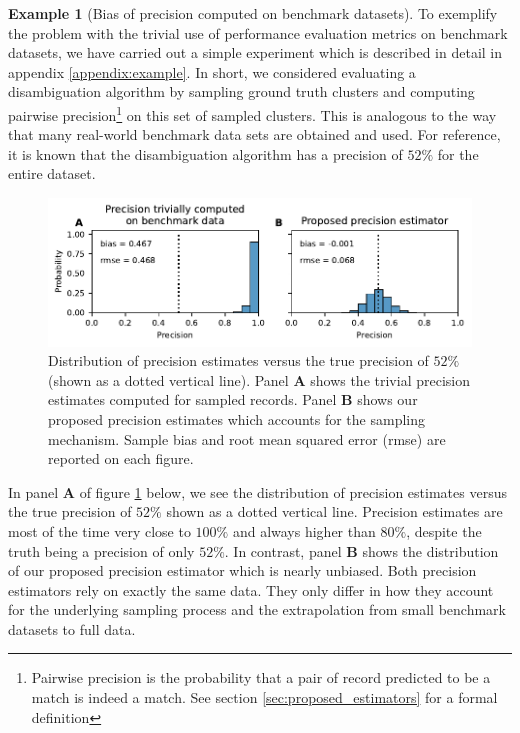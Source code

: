 \documentclass[fontsize=11pt]{article}
\theoremstyle{definition}
\newtheorem{example}{Example}
\begin{document}
\begin{example}[Bias of precision computed on benchmark datasets]\label{first_example}
    To exemplify the problem with the trivial use of performance evaluation metrics on benchmark datasets, we have carried out a simple experiment which is described in detail in appendix \ref{appendix:example}. In short, we considered evaluating a disambiguation algorithm by sampling ground truth clusters and computing pairwise precision\footnote{Pairwise precision is the probability that a pair of record predicted to be a match is indeed a match. See section \ref{sec:proposed_estimators} for a formal definition} on this set of sampled clusters. This is analogous to the way that many real-world benchmark data sets are obtained and used. For reference, it is known that the disambiguation algorithm has a precision of $52\%$ for the entire dataset.
    
    \begin{figure}[h]
        \centering
        \includegraphics[width=5.5in]{first-example}
        \caption{Distribution of precision estimates versus the true precision of $52\%$ (shown as a dotted vertical line). Panel \textbf{A} shows the trivial precision estimates computed for sampled records. Panel \textbf{B} shows our proposed precision estimates which accounts for the sampling mechanism. Sample bias and root mean squared error (rmse) are reported on each figure.}
        \label{fig:precision_problem}
    \end{figure}
    
    In panel \textbf{A} of figure \ref{fig:precision_problem} below, we see the distribution of precision estimates versus the true precision of $52\%$ shown as a dotted vertical line. Precision estimates are most of the time very close to $100\%$ and always higher than $80\%$, despite the truth being a precision of only $52\%$. In contrast, panel \textbf{B} shows the distribution of our proposed precision estimator which is nearly unbiased. Both precision estimators rely on exactly the same data. They only differ in how they account for the underlying sampling process and the extrapolation from small benchmark datasets to full data.
    
\end{example}
\end{document}
